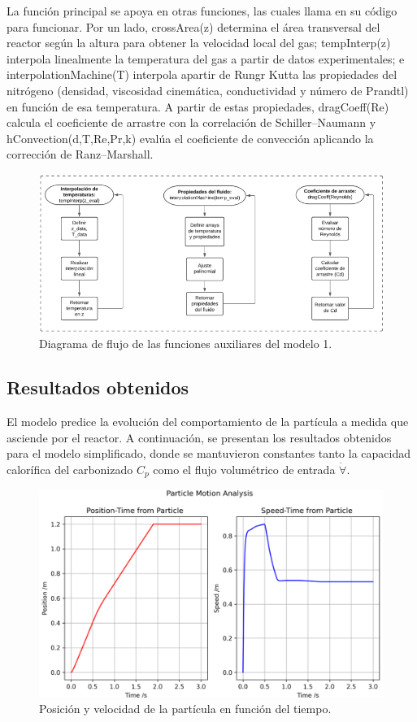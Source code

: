 \documentclass[11pt,stdletter,orderfromtodate,sigleft,twoside]{report}
\begin{document}
La función principal se apoya en otras funciones, las cuales llama en su código para funcionar. Por un lado, crossArea(z) determina el área transversal del reactor según la altura para obtener la velocidad local del gas; tempInterp(z) interpola linealmente la temperatura del gas a partir de datos experimentales; e interpolationMachine(T) interpola apartir de Rungr Kutta las propiedades del nitrógeno (densidad, viscosidad cinemática, conductividad y número de Prandtl) en función de esa temperatura. A partir de estas propiedades, dragCoeff(Re) calcula el coeficiente de arrastre con la correlación de Schiller–Naumann y hConvection(d,T,Re,Pr,k) evalúa el coeficiente de convección aplicando la corrección de Ranz–Marshall.

\begin{figure}[H]
    \centering
    \includegraphics[width=0.85\linewidth]{figures/DiagramaAux.png}
    \caption{Diagrama de flujo de las funciones auxiliares del modelo 1.}
    \label{fig:enter-label}
\end{figure}

\subsection{Resultados obtenidos}
El modelo predice la evolución del comportamiento de la partícula a medida que asciende por el reactor. A continuación, se presentan los resultados obtenidos para el modelo simplificado, donde se mantuvieron constantes tanto la capacidad calorífica del carbonizado $C_p$ como el flujo volumétrico de entrada $\dot{\forall}$.

\begin{figure}[H]
    \centering
    \includegraphics[width=0.6\linewidth]{figures/Cte4.png}
    \caption{Posición y velocidad de la partícula en función del tiempo.}
    \label{fig:enter-label}
\end{figure}
\end{document}
